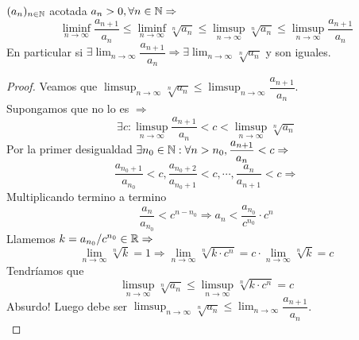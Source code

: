 \begin{theorem}
  $(a_n)_{n \in \mathbb{N}}$ acotada $a_n > 0, \forall n \in \mathbb{N} \Rightarrow$ \begin{equation}
    \liminf_{n \to \infty} \dfrac{a_{n+1}}{a_n} \leq \liminf_{n \to \infty} \sqrt[n]{a_n} \leq \limsup_{n \to \infty} \sqrt[n]{a_n} \leq \limsup_{n \to \infty} \dfrac{a_{n+1}}{a_n}
  \end{equation}
  En particular si $\exists \lim_{n \to \infty} \dfrac{a_{n+1}}{a_n} \Rightarrow \exists \lim_{n \to \infty} \sqrt[n]{a_n}$ y son iguales.

  \begin{proof}
    Veamos que $\limsup_{n \to \infty} \sqrt[n]{a_n} \leq \limsup_{n \to \infty} \dfrac{a_{n+1}}{a_n}$. \\
    Supongamos que no lo es $\Rightarrow$
    \begin{equation}
      \exists c : \limsup_{n \to \infty} \dfrac{a_{n+1}}{a_n} < c < \limsup_{n \to \infty} \sqrt[n]{a_n}
    \end{equation} Por la primer desigualdad $\exists n_0 \in \mathbb{N} : \forall n > n_0, \dfrac{a_{n+1}}{a_n} < c \Rightarrow$ \begin{equation}
      \dfrac{a_{n_0+1}}{a_{n_0}} < c, \dfrac{a_{n_0+2}}{a_{n_0+1}} < c, \cdots, \dfrac{a_n}{a_{n+1}} < c \Rightarrow
    \end{equation}
    Multiplicando termino a termino
    \begin{equation}
      \dfrac{a_n}{a_{n_0}} < c^{n - n_0} \Rightarrow a_n < \dfrac{a_{n_0}}{c^{n_0}} \cdot c^n
    \end{equation} Llamemos $k = a_{n_0}/c^{n_0} \in \mathbb{R} \Rightarrow$ \begin{equation}
      \lim_{n \to \infty} \sqrt[n]{k} = 1 \Rightarrow \lim_{n \to \infty} \sqrt[n]{k \cdot c^n} = c \cdot \lim_{n \to \infty} \sqrt[n]{k} = c
    \end{equation} Tendríamos que \begin{equation}
      \limsup_{n \to \infty} \sqrt[n]{a_n} \leq \limsup_{n \to \infty} \sqrt[n]{k \cdot c^n} = c
    \end{equation} Absurdo!
    Luego debe ser $\limsup_{n \to \infty} \sqrt[n]{a_n} \leq \lim_{n \to \infty} \dfrac{a_{n+1}}{a_n}$. \\
  \end{proof}
\end{theorem}

